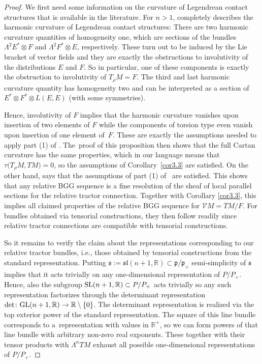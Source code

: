 \documentclass[pdftex]{sigma}
\numberwithin{equation}{section}
\def\frak{\mathfrak}
\def\Bbb{\mathbb}
\def\Cal{\mathcal}
\newcommand{\La}{\Lambda}
\begin{document}
\begin{proof}
 We first need some information on the curvature of Legendrean contact structures
 that is available in the literature. For $n>1$, \cite[Proposition 4.3.2]{book}
 completely describes the harmonic curvature of Legendrean contact structures: There
 are two harmonic curvature quantities of homogeneity one, which are sections of the
 bundles $\La^2E^*\otimes F$ and $\La^2F^*\otimes E$, respectively. These turn out
 to be induced by the Lie bracket of vector fields and they are exactly the
 obstructions to involutivity of the distributions $E$ and $F$. So in particular,
 one of these components is exactly the obstruction to involutivity of $T_\rho
 M=F$. The third and last harmonic curvature quantity has homogeneity two and can be
 interpreted as a section of $E^*\otimes F^*\otimes L(E,E)$ (with some symmetries).

Hence, involutivity of $F$ implies that the harmonic curvature vanishes upon insertion
of two elements of $F$ while the components of torsion type even vanish upon
insertion of one element of~$F$. These are exactly the assumptions needed to apply
part (1) of \cite[Proposition~4.18]{Rel-BGG2}. The~proof of this proposition then
shows that the full Cartan curvature has the same properties, which in our language
means that $\tau\bigl(T_\rho M,TM\bigr)=0$, so the assumptions of Corollary~\ref{cor3.3} are
satisfied. On the other hand, \cite[Proposition~4.18]{Rel-BGG2} says that the
assumptions of part (1) of~\mbox{\cite[Theorem 4.11]{Rel-BGG2}} are satisfied. This shows
that any relative BGG sequence is a fine resolution of the sheaf of local parallel
sections for the relative tractor connection. Together with Corollary \ref{cor3.3},
this implies all claimed properties of the relative BGG sequence for $\Cal
VM=TM/F$. For bundles obtained via tensorial constructions, they then follow readily
since relative tractor connections are compatible with tensorial constructions.

So it remains to verify the claim about the representations corresponding to our
relative tractor bundles, i.e., those obtained by tensorial constructions from the
standard representation. Putting
$\frak s:=\frak{sl}(n+1,\Bbb R)\subset\frak p/\frak p_+$ semi-simplicity of $\frak s$
implies that it acts trivially on any one-dimensional representation of
$P/P_+$. Hence, also the subgroup ${\rm SL}(n+1,\Bbb R)\subset P/P_+$ acts trivially so any
such representation factorizes through the determinant representation
$\det\colon {\rm GL}(n+1,\Bbb R)\to\Bbb R\setminus\{0\}$. The determinant representation is
realized via the top exterior power of the standard representation. The square of
this line bundle corresponds to a~representation with values in $\Bbb R^+$, so we
can form powers of that line bundle with arbitrary non-zero real
exponents. These together with their tensor products with $\La^nTM$ exhaust all
possible one-dimensional representations of $P/P_+$.


\end{proof}
\end{document}
